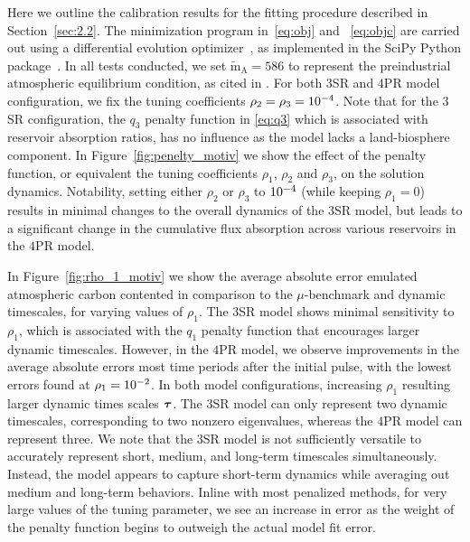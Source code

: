 \documentclass[11pt, a4paper, pdftex, twoside, dvipsnames]{article}
\renewcommand{\ref}{\cref}
\newcommand{\bb}[1]{\boldsymbol{\bold{#1}}}
\newcommand{\bbt}[1]{\tilde{\boldsymbol{\mathrm{#1}}}}
\newcommand{\expnum}[2]{
\ifnum#1=1 
  10^{#2} 
\else 
  #1 \! \cdot \! 10^{#2}
\fi
}
\begin{document}
%
Here we outline the calibration results for the fitting procedure described in Section~\ref{sec:2.2}.
%
The minimization program in~\eqref{eq:obj} and ~\eqref{eq:objc} are carried out using a differential evolution optimizer~\cite{diff_evol}, as implemented in the SciPy Python package~\cite{scipy}.
%
In all tests conducted, we set $\bbt{m}_{\text{A}} = 586$ to represent the preindustrial atmospheric equilibrium condition, as cited in \cite{IPCC_carbon_cycle}. 
%
For both $3$SR and $4$PR model configuration, we fix the tuning coefficients $\rho_2=\rho_3=\expnum{1}{-4}$.
%
Note that for the $3$SR configuration, the $q_3$ penalty function in \eqref{eq:q3} which is associated with reservoir absorption ratios, has no influence as the model lacks a land-biosphere component.
%
In Figure~\ref{fig:penelty_motiv} we show the effect of the penalty function, or equivalent the tuning coefficients $\rho_1$, $\rho_2$ and $\rho_3$, on the solution dynamics.
%
Notability, setting either $\rho_2$ or $\rho_3$ to $\expnum{1}{-4}$ (while keeping $\rho_1=0$) results in minimal changes to the overall dynamics of the $3$SR model, but leads to a significant change in the cumulative flux absorption across various reservoirs in the $4$PR model.

In Figure~\ref{fig:rho_1_motiv} we show the average absolute error emulated atmospheric carbon contented in comparison to the $\mu$-benchmark and dynamic timescales, for varying values of $\rho_1$.
 The $3$SR model shows minimal sensitivity to $\rho_1$, which is associated with the $q_1$ penalty function that encourages larger dynamic timescales.
%
However, in the $4$PR model, we observe improvements in the average absolute errors most time periods after the initial pulse, with the lowest errors found at $\rho_1=\expnum{1}{-2}$.
%
In both model configurations, increasing $\rho_1$ resulting larger dynamic times scales $\bb{\tau}$. 
%
The $3$SR model can only represent two dynamic timescales, corresponding to two nonzero eigenvalues, whereas the $4$PR model can represent three.
%
We note that the $3$SR model is not sufficiently versatile to accurately represent short, medium, and long-term timescales simultaneously. 
%
Instead, the model appears to capture short-term dynamics while averaging out medium and long-term behaviors.
%
Inline with most penalized methods, for very large values of the tuning parameter, we see an increase in error as the weight of the penalty function begins to outweigh the actual model fit error.
 
\end{document}
